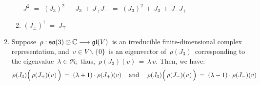 \begin{proposition}
\begin{enumerate}
\begin{enumerate}
		$J^{2}$
		\; $=$ \; $(J_{3})^{2} \,-\, J_{3} \,+\, J_{+}J_{-}$
		\; $=$ \; $(J_{3})^{2} \,+\, J_{3} \,+\, J_{-}J_{+}$
	\item
		$(J_{\pm})^{\dagger} \; = \; J_{\mp}$
	\end{enumerate}
\item
	Suppose
	\,$\rho : \mathfrak{so}(3) \otimes \mathbb{C} \longrightarrow \mathfrak{gl}(V)$\,
	is an irreducible finite-dimensional complex representation, and
	\,$v \in V \backslash\{0\}$\, is an eigenvector of \,$\rho(J_{3})$\,
	corresponding to the eigenvalue \,$\lambda \in \Re$;\, thus, \,$\rho(J_{3})(v) \,=\, \lambda\,v$.
	Then, we have:
	\begin{equation*}
	\rho(J_{3})\!\left(\,\rho(J_{+})(\overset{{\color{white}-}}{v})\,\right) \, = \; (\lambda+1)\cdot\rho(J_{+})(v)\,
	\quad\textnormal{and}\quad\;
	\rho(J_{3})\!\left(\,\rho(J_{-})(\overset{{\color{white}-}}{v})\,\right) \, = \; (\lambda-1)\cdot\rho(J_{-})(v)
	\end{equation*}
\end{enumerate}
\end{proposition}


